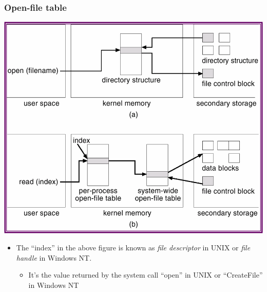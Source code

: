 \documentclass[CJKutf8,xcolor=pdftex,dvipsnames,table]{beamer}
\begin{document}
\begin{CJK*}{UTF8}{song}
  \begin{frame}
    \frametitle{Open-file table} \pause
    \begin{center}
      \includegraphics[scale=0.4]{v6f12-3} \pause
    \end{center}
    \begin{itemize}\parskip=0pt
    \item The ``index'' in the above figure is known as \emph{file descriptor} in UNIX or \emph{file handle} in Windows NT. \pause
      \begin{itemize}\parskip=0pt
      \item It's the value returned by the system call ``open'' in UNIX or ``CreateFile'' in Windows NT
      \end{itemize}
    \end{itemize}
  \end{frame}
  

\end{CJK*}
\end{document}
